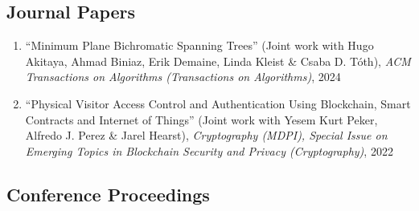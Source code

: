 \documentclass[letterpaper,11pt]{article}
\makeatletter
\newcommand{\resumeSubHeadingListStart}{\begin{itemize}[leftmargin=*]}
\newcommand{\resumeSubHeadingListEnd}{\end{itemize}}
\newcommand{\publication}[6]{
  \item ``#1'' %
   (Joint work with#2), %
     \emph{#3}, %
      #4%


}
\newcommand{\pdficon}{\faFilePdf}
\newcommand{\doilabel}{\texttt{DOI}}
\makeatother
\begin{document}
    \subsection*{Journal Papers}%
  
    \begin{enumerate}
    \setcounter{enumi}{\value{pubnum}}
      
        \publication
          {Minimum Plane Bichromatic Spanning Trees}
          {
 Hugo Akitaya, Ahmad Biniaz, Erik Demaine, Linda Kleist \& Csaba D. Tóth}
          {ACM Transactions on Algorithms (Transactions on Algorithms)}
          {2024}
          {%
\href{tba/docstore/MPBST-Transactions.pdf}{\pdficon}%
%
\quad\href{https://doi.org/10.1145/3747591}{\doilabel}%
          }
          {1}
 \vspace{-.5em}  
      
        \publication
          {Physical Visitor Access Control and Authentication Using Blockchain, Smart Contracts and Internet of Things}
          {
 Yesem Kurt Peker, Alfredo J. Perez \& Jarel Hearst}
          {Cryptography (MDPI), Special Issue on Emerging Topics in Blockchain Security and Privacy (Cryptography)}
          {2022}
          {%
\href{tba/docstore/Blockchain-AccessControl-MDPI.pdf}{\pdficon}%
%
\quad\href{https://doi.org/10.3390/cryptography6040065}{\doilabel}%
          }
          {2}
 
    \setcounter{pubnum}{\value{enumi}}
    \end{enumerate}
    \subsection*{Conference Proceedings}%
  
\end{document}

